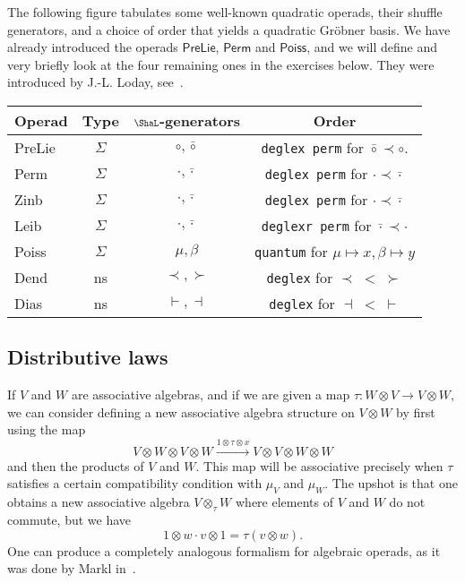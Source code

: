 The following figure tabulates some well-known
quadratic operads, their shuffle generators,
and a choice of order that yields a quadratic
Gr\"obner basis. We have already introduced the
operads $\mathsf{PreLie}$, $\mathsf{Perm}$ and
$\mathsf{Poiss}$, and we will define and
very briefly look at the
four remaining ones
in the exercises below. They were
introduced by
J.-L. Loday, see~\cite{LodayDialg, LodayLeib}.

\begin{center}
\begin{tabular}{@{}lccc@{}} \toprule
Operad & Type & $\Sha$-generators & Order \\
\midrule 
PreLie & $\Sigma$ & $\circ,\bar\circ$ & 
	\texttt{deglex perm} for $\bar\circ \prec \circ$.\\
Perm &   $\Sigma$ & $\cdot,\bar\cdot$ &
	\texttt{deglex perm} for $\cdot \prec \bar \cdot$  \\
Zinb &  $\Sigma$  & $\cdot,\bar\cdot$ &
	\texttt{deglex perm} for $\cdot \prec \bar \cdot$ \\

Leib &  $\Sigma$  & $\cdot,\bar\cdot$ & 
	\texttt{deglexr perm} for $\bar\cdot \prec \cdot$\\

Poiss &   $\Sigma$ & $\mu,\beta$ & \texttt{quantum} for $\mu\mapsto x,\beta\mapsto y$ \\
Dend &  ns  & $\prec,\succ$ & \texttt{deglex} for $\prec\; < \;\succ$\\
Dias &   ns  & $\vdash,\dashv$ & \texttt{deglex} for $\dashv\; < \; \vdash$\\
\bottomrule
\end{tabular}
\end{center}




\subsection{Distributive laws}

If $V$ and $W$ are associative algebras, and if we
are given a map $\tau : W\otimes V\longrightarrow V\otimes W$,
we can consider defining a new associative algebra structure
on $V\otimes W$ by first using the map
\[
V\otimes W\otimes V\otimes W 
	\xrightarrow{1\otimes \tau\otimes x}
	 V\otimes V\otimes W\otimes W
	 \]
and then the products of $V$ and $W$. This map will be
associative precisely when $\tau$ satisfies a certain
compatibility condition with $\mu_V$ and $\mu_W$. The upshot
is that one obtains a new associative algebra
$V\otimes_\tau W$ where elements of $V$ and $W$ do not
commute, but we have
\[ 1\otimes w\cdot v\otimes 1 = \tau(v\otimes w).
\]
One can produce a completely analogous formalism for
algebraic operads, as it was done by Markl in~\cite{MarklDistributive}. 

